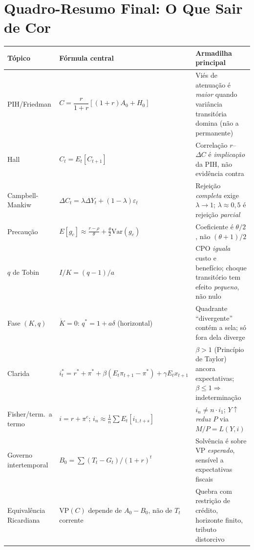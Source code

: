 \documentclass[12pt, a4paper]{article}
\begin{document}
\section*{Quadro-Resumo Final: O Que Sair de Cor}

\begin{center}
\renewcommand{\arraystretch}{1.4}
\begin{tabular}{p{3.0cm} p{5.6cm} p{5.6cm}}
\toprule
\textbf{Tópico} & \textbf{Fórmula central} & \textbf{Armadilha principal} \\
\midrule
PIH/Friedman & $C=\dfrac{r}{1+r}[(1+r)A_0+H_0]$ & Viés de atenuação é \emph{maior} quando variância transitória domina (não a permanente) \\
Hall & $C_t=E_t[C_{t+1}]$ & Correlação $r$--$\Delta C$ é \emph{implicação} da PIH, não evidência contra \\
Campbell-Mankiw & $\Delta C_t=\lambda\Delta Y_t+(1-\lambda)\varepsilon_t$ & Rejeição \emph{completa} exige $\lambda\to1$; $\lambda\approx0{,}5$ é rejeição \emph{parcial} \\
Precaução & $E[g_c]\approx\frac{r-\rho}{\theta}+\frac{\theta}{2}\mathrm{Var}(g_c)$ & Coeficiente é $\theta/2$, não $(\theta+1)/2$ \\
$q$ de Tobin & $I/K=(q-1)/a$ & CPO \emph{iguala} custo e benefício; choque transitório tem efeito \emph{pequeno}, não nulo \\
Fase $(K,q)$ & $\dot K=0$: $q^*=1+a\delta$ (horizontal) & Quadrante ``divergente'' contém a sela; só fora dela diverge \\
Clarida & $i_t^*=r^*+\pi^*+\beta(E_t\pi_{t+1}-\pi^*)+\gamma E_t x_{t+1}$ & $\beta>1$ (Princípio de Taylor) ancora expectativas; $\beta\le1\Rightarrow$ indeterminação \\
Fisher/term.\ a termo & $i=r+\pi^e$; $i_n\approx\frac1n\sum E_t[i_{1,t+s}]$ & $i_n\neq n\cdot i_1$; $Y\uparrow$ \emph{reduz} $P$ via $M/P=L(Y,i)$ \\
Governo intertemporal & $B_0=\sum (T_t-G_t)/(1+r)^t$ & Solvência é sobre VP \emph{esperado}, sensível a expectativas fiscais \\
Equivalência Ricardiana & VP$(C)$ depende de $A_0-B_0$, não de $T_t$ corrente & Quebra com restrição de crédito, horizonte finito, tributo distorcivo \\
\bottomrule
\end{tabular}
\end{center}
\end{document}
